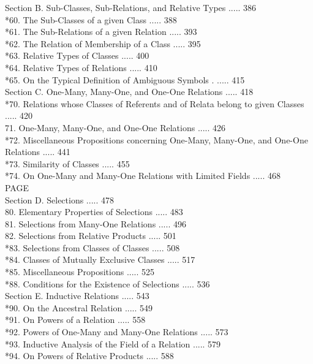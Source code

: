 \documentclass[10pt]{article}
\begin{document}
Section B. Sub-Classes, Sub-Relations, and Relative Types ..... 386\\
*60. The Sub-Classes of a given Class ..... 388\\
*61. The Sub-Relations of a given Relation ..... 393\\
*62. The Relation of Membership of a Class ..... 395\\
*63. Relative Types of Classes ..... 400\\
*64. Relative Types of Relations ..... 410\\
*65. On the Typical Definition of Ambiguous Symbols . ..... 415\\
Section C. One-Many, Many-One, and One-One Relations ..... 418\\
*70. Relations whose Classes of Referents and of Relata belong to given Classes ..... 420\\
71. One-Many, Many-One, and One-One Relations ..... 426\\
*72. Miscellaneous Propositions concerning One-Many, Many-One, and One-One Relations ..... 441\\
*73. Similarity of Classes ..... 455\\
*74. On One-Many and Many-One Relations with Limited Fields ..... 468\\
PAGE\\
Section D. Selections ..... 478\\
80. Elementary Properties of Selections ..... 483\\
81. Selections from Many-One Relations ..... 496\\
82. Selections from Relative Products ..... 501\\
*83. Selections from Classes of Classes ..... 508\\
*84. Classes of Mutually Exclusive Classes ..... 517\\
*85. Miscellaneous Propositions ..... 525\\
*88. Conditions for the Existence of Selections ..... 536\\
Section E. Inductive Relations ..... 543\\
*90. On the Ancestral Relation ..... 549\\
*91. On Powers of a Relation ..... 558\\
*92. Powers of One-Many and Many-One Relations ..... 573\\
*93. Inductive Analysis of the Field of a Relation ..... 579\\
*94. On Powers of Relative Products ..... 588\\
\end{document}
